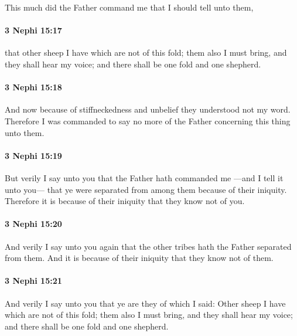 			This much did the Father command me that I should tell unto them,

		\paragraph{3 Nephi 15:17} %
			\label{3NEPHI-15-17}

			that other sheep I have which are not of this fold;
			them also I must bring, and they shall hear my voice;
			and there shall be one fold and one shepherd.

		\paragraph{3 Nephi 15:18} %
			\label{3NEPHI-15-18}

			And now because of stiffneckedness and unbelief
			they understood not my word.
			Therefore I was commanded to say no more
			of the Father concerning this thing unto them.

		\paragraph{3 Nephi 15:19} %
			\label{3NEPHI-15-19}

			But verily I say unto you that the Father hath commanded me
			---and I tell it unto you---
			that ye were separated from among them because of their iniquity.
			Therefore it is because of their iniquity that they know not of you.

		\paragraph{3 Nephi 15:20} %
			\label{3NEPHI-15-20}

			And verily I say unto you again
			that the other tribes hath the Father separated from them.
			And it is because of their iniquity that they know not of them.

		\paragraph{3 Nephi 15:21} %
			\label{3NEPHI-15-21}

			And verily I say unto you
			that ye are they of which I said:
			Other sheep I have which are not of this fold;
			them also I must bring, and they shall hear my voice;
			and there shall be one fold and one shepherd.

